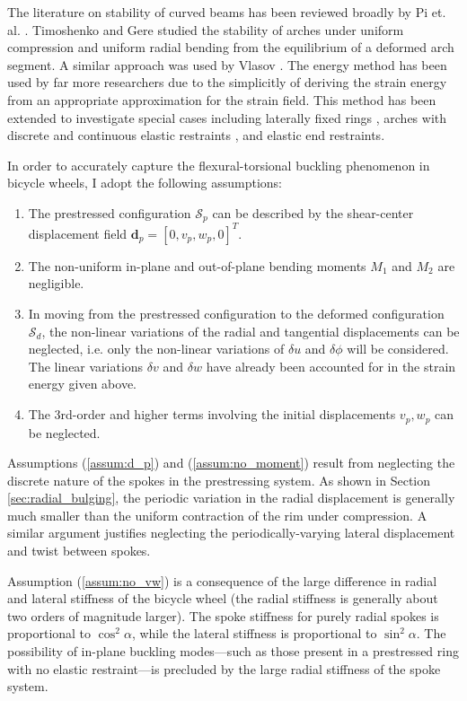 \documentclass[\rootdir/thesis.tex]{subfiles}
\begin{document}
The literature on stability of curved beams has been reviewed broadly by Pi et. al. \cite{Pi2005}. Timoshenko and Gere \cite{Timoshenko1961} studied the stability of arches under uniform compression and uniform radial bending from the equilibrium of a deformed arch segment. A similar approach was used by Vlasov \cite{Vlasov1961}. The energy method has been used by far more researchers \cite{Yoo1982,Trahair1987,Pi1992,Kang1994,Pi1995,Lim2004,Ryu2012} due to the simplicitly of deriving the strain energy from an appropriate approximation for the strain field. This method has been extended to investigate special cases including laterally fixed rings \cite{Teng1988b}, arches with discrete and continuous elastic restraints \cite{Pi2002,Bradford2002}, and elastic end restraints.

In order to accurately capture the flexural-torsional buckling phenomenon in bicycle wheels, I adopt the following assumptions:
\begin{enumerate}
	\item{The prestressed configuration $\mathcal{S}_p$ can be described by the shear-center displacement field $\mathbf{d}_p = [0, v_p, w_p, 0]^T$.}\label{assum:d_p}
	\item{The non-uniform in-plane and out-of-plane bending moments $M_1$ and $M_2$ are negligible.}\label{assum:no_moment}
	\item{In moving from the prestressed configuration to the deformed configuration $\mathcal{S}_d$, the non-linear variations of the radial and tangential displacements can be neglected, i.e. only the non-linear variations of $\delta u$ and $\delta\phi$ will be considered. The linear variations $\delta v$ and $\delta w$ have already been accounted for in the strain energy given above.}\label{assum:no_vw}
	\item{The 3rd-order and higher terms involving the initial displacements $v_p,w_p$ can be neglected.}\label{assum:no_prebuckle}
\end{enumerate}

Assumptions (\ref{assum:d_p}) and (\ref{assum:no_moment}) result from neglecting the discrete nature of the spokes in the prestressing system. As shown in Section \ref{sec:radial_bulging}, the periodic variation in the radial displacement is generally much smaller than the uniform contraction of the rim under compression. A similar argument justifies neglecting the periodically-varying lateral displacement and twist between spokes.

Assumption (\ref{assum:no_vw}) is a consequence of the large difference in radial and lateral stiffness of the bicycle wheel (the radial stiffness is generally about two orders of magnitude larger). The spoke stiffness for purely radial spokes is proportional to $\cos^2{\alpha}$, while the lateral stiffness is proportional to $\sin^2{\alpha}$. The possibility of in-plane buckling modes---such as those present in a prestressed ring with no elastic restraint---is precluded by the large radial stiffness of the spoke system.
\end{document}
